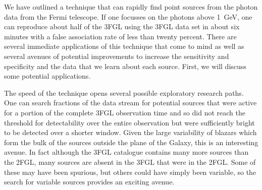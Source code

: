 \documentclass[useAMS,usenatbib]{mn2e}
\begin{document}
We have outlined a technique that can rapidly find point sources from
the photon data from the Fermi telescope.  If one focusses on the
photons above 1~GeV, one can reproduce about half of the 3FGL using
the 3FGL data set in about six minutes with a false association rate of
less than twenty percent.  There are several immediate applications of
this technique that come to mind as well as several avenues of
potential improvements to increase the sensitivity and specificity
and the data that we learn about each source.  First, we will discuss
some potential applications.

The speed of the technique opens several possible exploratory research
paths.  One can search fractions of the data stream for potential
sources that were active for a portion of the complete 3FGL observation
time and so did not reach the threshold for detectability over the
entire observation but were sufficiently bright to be detected over a
shorter window.  Given the large variability of blazars which form the
bulk of the sources outside the plane of the Galaxy, this is an
interesting avenue.  In fact although the 3FGL catalogue contains many
more sources than the 2FGL, many sources are absent in the 3FGL that
were in the 2FGL.  Some of these may have been spurious, but others
could have simply been variable, so the search for variable sources
provides an exciting avenue.
\end{document}

